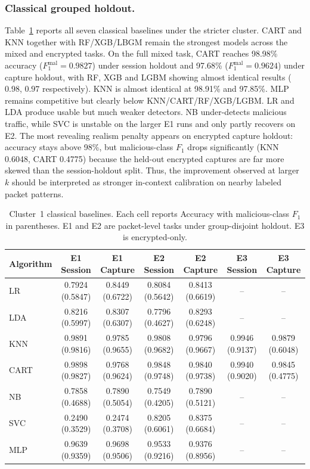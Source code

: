 \documentclass[conference]{IEEEtran}
\begin{document}
\subsubsection{Classical grouped holdout.}
Table~\ref{tab:strict-classical} reports all seven classical baselines under the stricter cluster. CART and KNN together with RF/XGB/LBGM remain the strongest models across the mixed and encrypted tasks. On the full mixed task, CART reaches 98.98\% accuracy ($F_1^{\mathrm{mal}}=0.9827$) under session holdout and 97.68\% ($F_1^{\mathrm{mal}}=0.9624$) under capture holdout, with RF, XGB and LGBM showing almost identical results ($0.98$, $0.97$ respectively). KNN is almost identical at 98.91\% and 97.85\%. MLP remains competitive but clearly below KNN/CART/RF/XGB/LGBM. LR and LDA produce usable but much weaker detectors. NB under-detects malicious traffic, while SVC is unstable on the larger E1 runs and only partly recovers on E2. The most revealing realism penalty appears on encrypted capture holdout: accuracy stays above 98\%, but malicious-class $F_1$ drops significantly (KNN 0.6048, CART 0.4775) because the held-out encrypted captures are far more skewed than the session-holdout split. Thus, the improvement observed at larger $k$ should be interpreted as stronger in-context calibration on nearby labeled packet patterns.

\begin{table}[t]
\centering
\caption{Cluster~1 classical baselines. Each cell reports Accuracy with malicious-class $F_1$ in parentheses. E1 and E2 are packet-level tasks under group-disjoint holdout. E3 is encrypted-only.}
\label{tab:strict-classical}
\footnotesize
\begin{tabular}{lcccccc}
\toprule
Algorithm & E1 Session & E1 Capture & E2 Session & E2 Capture & E3 Session & E3 Capture \\
\midrule
LR   & 0.7924 (0.5847) & 0.8449 (0.6722) & 0.8084 (0.5642) & 0.8413 (0.6619) & -- & -- \\
LDA  & 0.8216 (0.5997) & 0.8307 (0.6307) & 0.7796 (0.4627) & 0.8293 (0.6248) & -- & -- \\
KNN  & 0.9891 (0.9816) & 0.9785 (0.9655) & 0.9808 (0.9682) & 0.9796 (0.9667) & 0.9946 (0.9137) & 0.9879 (0.6048) \\
CART & 0.9898 (0.9827) & 0.9768 (0.9624) & 0.9848 (0.9748) & 0.9840 (0.9738) & 0.9940 (0.9020) & 0.9845 (0.4775) \\
NB   & 0.7858 (0.4688) & 0.7890 (0.5054) & 0.7549 (0.4205) & 0.7890 (0.5121) & -- & -- \\
SVC  & 0.2490 (0.3529) & 0.2474 (0.3708) & 0.8205 (0.6061) & 0.8375 (0.6684) & -- & -- \\
MLP  & 0.9639 (0.9359) & 0.9698 (0.9506) & 0.9533 (0.9216) & 0.9376 (0.8956) & -- & -- \\
\bottomrule
\end{tabular}
\end{table}
\end{document}
